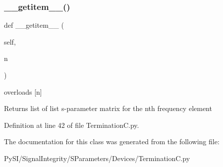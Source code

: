 \subsubsection{\texorpdfstring{\+\_\+\+\_\+getitem\+\_\+\+\_\+()}{\_\_getitem\_\_()}}
{\footnotesize\ttfamily def \+\_\+\+\_\+getitem\+\_\+\+\_\+ (\begin{DoxyParamCaption}\item[{}]{self,  }\item[{}]{n }\end{DoxyParamCaption})}



overloads \mbox{[}n\mbox{]} 

\begin{DoxyReturn}{Returns}
list of list s-\/parameter matrix for the nth frequency element 
\end{DoxyReturn}


Definition at line 42 of file Termination\+C.\+py.



The documentation for this class was generated from the following file\+:\begin{DoxyCompactItemize}
\item 
Py\+S\+I/\+Signal\+Integrity/\+S\+Parameters/\+Devices/Termination\+C.\+py\end{DoxyCompactItemize}
